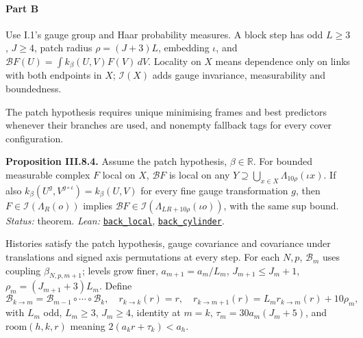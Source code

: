 \documentclass[
  letterpaper,
  11pt]{article}
\newcounter{none} %
\begin{document}
\paragraph{Part B}\label{part-b}

Use I.1's gauge group and Haar probability measures. A block step has
odd \(L\ge3\), \(J\ge4\), patch radius \(\rho=(J+3)L\), embedding
\(\iota\), and \(\mathcal BF(U)=\int k_\beta(U,V)F(V)\,dV\). Locality on
\(X\) means dependence only on links with both endpoints in \(X\);
\(\mathcal I(X)\) adds gauge invariance, measurability and boundedness.

The patch hypothesis requires unique minimising frames and best
predictors whenever their branches are used, and nonempty fallback tags
for every cover configuration.

\textbf{Proposition III.8.4.} Assume the patch hypothesis,
\(\beta\in\mathbb R\). For bounded measurable complex \(F\) local on
\(X\), \(\mathcal BF\) is local on any
\(Y\supseteq\bigcup_{x\in X}\Lambda_{10\rho}(\iota x)\). If also
\(k_\beta(U^g,V^{g\circ\iota})=k_\beta(U,V)\) for every fine gauge
transformation \(g\), then \(F\in\mathcal I(\Lambda_R(o))\) implies
\(\mathcal BF\in\mathcal I(\Lambda_{LR+10\rho}(\iota o))\), with the
same sup bound. \emph{Status:} theorem. \emph{Lean:}
\href{https://github.com/yang-mills-group/OpenAI-YM-20261028/blob/3456e5e75cf8d4cd558955a5c7638fba2d68f464/YM/Push/GRID_APPROXIMATION/KernelLocal.lean\#L119-L136}{\texttt{back\_local}},
\href{https://github.com/yang-mills-group/OpenAI-YM-20261028/blob/3456e5e75cf8d4cd558955a5c7638fba2d68f464/YM/Push/GRID_APPROXIMATION/KernelLocal.lean\#L156-L169}{\texttt{back\_cylinder}}.

Histories satisfy the patch hypothesis, gauge covariance and covariance
under translations and signed axis permutations at every step. For each
\(N,p\), \(\mathcal B_m\) uses coupling \(\beta_{N,p,m+1}\); levels grow
finer, \(a_{m+1}=a_m/L_m\), \(J_{m+1}\le J_m+1\),
\(\rho_m=(J_{m+1}+3)L_m\). Define
\[\mathcal B_{k\to m}=\mathcal B_{m-1}\circ\cdots\circ\mathcal B_k,\quad r_{k\to k}(r)=r,\quad r_{k\to m+1}(r)=L_mr_{k\to m}(r)+10\rho_m,\]
with \(L_m\) odd, \(L_m\ge3\), \(J_m\ge4\), identity at \(m=k\),
\(\tau_m=30a_m(J_m+5)\), and \(\mathrm{room}(h,k,r)\) meaning
\(2(a_kr+\tau_k)<a_h\).
\end{document}
